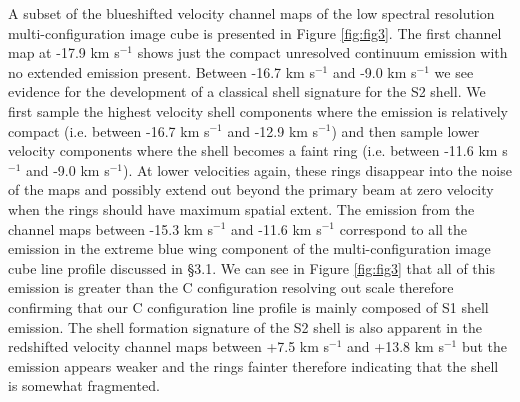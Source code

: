 \documentclass[iop]{emulateapj}
\begin{document}
A subset of the blueshifted velocity channel maps of the low spectral resolution multi-configuration image cube is presented in Figure \ref{fig:fig3}. The first channel map at -17.9 km s${}^{-1}$ shows just the compact unresolved continuum emission with no extended emission present. Between -16.7 km s${}^{-1}$ and -9.0 km s${}^{-1}$ we see evidence for the development of a classical shell signature for the S2 shell. We first sample the highest velocity shell components where the emission is relatively compact (i.e. between -16.7 km s${}^{-1}$ and -12.9 km s${}^{-1}$) and then sample lower velocity components where the shell becomes a faint ring (i.e. between -11.6 km s${}^{-1}$ and -9.0 km s${}^{-1}$). At lower velocities again, these rings disappear into the noise of the maps and possibly extend out beyond the primary beam at zero velocity when the rings should have maximum spatial extent. The emission from the channel maps between -15.3 km s${}^{-1}$ and -11.6 km s${}^{-1}$ correspond to all the emission in the extreme blue wing component of the multi-configuration image cube line profile discussed in \S3.1. We can see in Figure \ref{fig:fig3} that all of this emission is greater than the C configuration resolving out scale therefore confirming that our C configuration line profile is mainly composed of S1 shell emission. The shell formation signature of the S2 shell is also apparent in the redshifted velocity channel maps between +7.5 km s${}^{-1}$ and +13.8 km s${}^{-1}$ but the emission appears weaker and the rings fainter therefore indicating that the shell is somewhat fragmented. 
\end{document}
